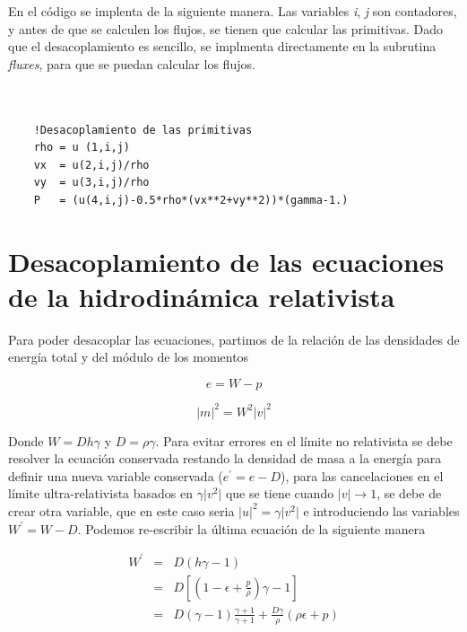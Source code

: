 \documentclass[12pt,a4paper]{book}
\providecommand{\abs}[1]{\lvert#1\rvert} %
\begin{document}
En el código se implenta de la siguiente manera.
Las variables \emph{i}, \emph{j} son contadores, y antes de que se calculen los flujos, se tienen que calcular las primitivas. Dado que el desacoplamiento
es sencillo, se implmenta directamente en la subrutina \emph{fluxes}, para que se puedan calcular los flujos.

\begin{lstlisting}[frame=single] 
  

    !Desacoplamiento de las primitivas
    rho = u (1,i,j)
    vx  = u(2,i,j)/rho
    vy  = u(3,i,j)/rho
    P   = (u(4,i,j)-0.5*rho*(vx**2+vy**2))*(gamma-1.)

\end{lstlisting}



\section{Desacoplamiento de las ecuaciones de la hidrodinámica relativista}
Para poder desacoplar las ecuaciones, partimos de la relación de las densidades de energía total y del módulo de los momentos

\begin{equation}\label{ecuacion_de_energia}
e=W-p
\end{equation}

\begin{equation}\label{modulos de los momentos}
\abs{m}^2= W^{2}\abs{v}^{2}
\end{equation}

Donde $W=D h \gamma$ y $D=\rho \gamma$. Para evitar errores en el límite no relativista se debe resolver la ecuación conservada restando la densidad de masa 
a la energía para definir una nueva variable conservada ($e^{'}=e-D$), para las cancelaciones en el límite ultra-relativista basados en $\gamma \abs{v^2}$ que se tiene cuando $\abs{v} \rightarrow 1$, se debe de crear otra variable, que en este caso seria $\abs{u}^2=\gamma \abs{v^2}$ e introduciendo las variables $W^{'}=W-D$. Podemos re-escribir la última ecuación de la siguiente manera

\begin{eqnarray*}
 W^{'}& = &D(h \gamma -1)\\
&=& D\left[ \left(1-\epsilon+ \frac{p}{\rho}\right) \gamma - 1 \right]\\
&=& D \left(\gamma-1 \right) \frac{\gamma+1}{\gamma+1}+\frac{D \gamma }{\rho}\left(\rho \epsilon + p \right)
\end{eqnarray*}
\end{document}
